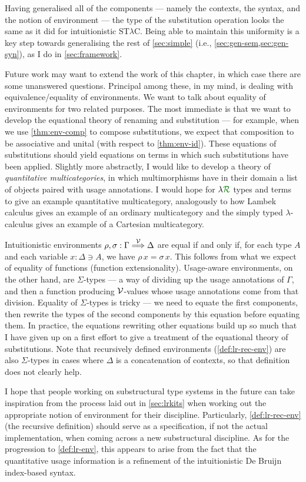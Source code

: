 Having generalised all of the components --- namely the contexts, the syntax,
and the notion of environment --- the type of the substitution operation looks
the same as it did for intuitionistic ST$\lambda$C\@.
Being able to maintain this uniformity is a key step towards generalising the
rest of \cref{sec:simple} (i.e., \cref{sec:gen-sem,sec:gen-syn}), as I do in
\cref{sec:framework}.

Future work may want to extend the work of this chapter, in which case
there are some unanswered questions.
Principal among these, in my mind, is dealing with equivalence/equality of
environments.
We want to talk about equality of environments for two related purposes.
The most immediate is that we want to develop the equational theory of renaming
and substitution --- for example, when we use \cref{thm:env-comp} to compose
substitutions, we expect that composition to be associative and unital (with
respect to \cref{thm:env-id}).
These equations of substitutions should yield equations on terms in which such
substitutions have been applied.
Slightly more abstractly, I would like to develop a theory of
\emph{quantitative multicategories}, in which multimorphisms have in their
domain a list of objects paired with usage annotations.
I would hope for $\name$ types and terms to give an example quantitative
multicategory, analogously to how Lambek calculus gives an example of an
ordinary multicategory and the simply typed $\lambda$-calculus gives an example
of a Cartesian multicategory.

Intuitionistic environments $\rho, \sigma : \Gamma \stackrel{\mathcal V}\Longrightarrow \Delta$ are equal
if and only if, for each type $A$ and each variable $x : \Delta \ni A$, we have
$\rho\,x = \sigma\,x$.
This follows from what we expect of equality of functions (function
extensionality).
Usage-aware environments, on the other hand, are $\Sigma$-types --- a way of
dividing up the usage annotations of $\Gamma$, and then a function producing
$\mathcal V$-values whose usage annotations come from that division.
Equality of $\Sigma$-types is tricky --- we need to equate the first components,
then rewrite the types of the second components by this equation before equating
them.
In practice, the equations rewriting other equations build up so much that
I have given up on a first effort to give a treatment of the equational theory
of substitutions.
Note that recursively defined environments (\cref{def:lr-rec-env}) are also
$\Sigma$-types in cases where $\Delta$ is a concatenation of contexts, so that
definition does not clearly help.

I hope that people working on substructural type systems in the future can take
inspiration from the process laid out in \cref{sec:lrkits} when working out the
appropriate notion of environment for their discipline.
Particularly, \cref{def:lr-rec-env} (the recursive definition) should serve as a
specification, if not the actual implementation, when coming across a new
substructural discipline.
As for the progression to \cref{def:lr-env}, this appears to arise from the fact
that the quantitative usage information is a refinement of the intuitionistic De
Bruijn index-based syntax.
